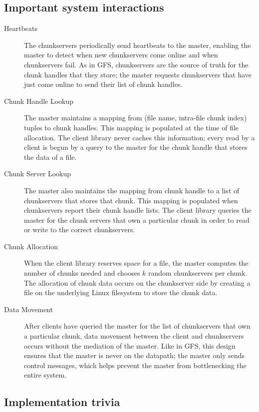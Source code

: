 \documentclass[letterpaper,twocolumn,10pt]{article}
\begin{document}
\subsection{Important system interactions}

\begin{description}
  \item[Heartbeats] The chunkservers periodically send heartbeats to the master, enabling the master to detect when new chunkservers come online and when chunkservers fail. As in GFS, chunkservers are the source of truth for the chunk handles that they store; the master requests chunkservers that have just come online to send their list of chunk handles.
  \item[Chunk Handle Lookup] The master maintains a mapping from (file name, intra-file chunk index) tuples to chunk handles. This mapping is populated at the time of file allocation. The client library never caches this information; every read by a client is begun by a query to the master for the chunk handle that stores the data of a file.
  \item[Chunk Server Lookup] The master also maintains the mapping from chunk handle to a list of chunkservers that stores that chunk. This mapping is populated when chunkservers report their chunk handle lists. The client library queries the master for the chunk servers that own a particular chunk in order to read or write to the correct chunkservers.
  \item[Chunk Allocation] When the client library reserves space for a file, the master computes the number of chunks needed and chooses $k$ random chunkservers per chunk. The allocation of chunk data occurs on the chunkserver side by creating a file on the underlying Linux filesystem to store the chunk data.
  \item[Data Movement] After clients have queried the master for the list of chunkservers that own a particular chunk, data movement between the client and chunkservers occurs without the mediation of the master. Like in GFS, this design ensures that the master is never on the datapath; the master only sends control messages, which helps prevent the master from bottlenecking the entire system.
\end{description}

\subsection{Implementation trivia}
\end{document}
